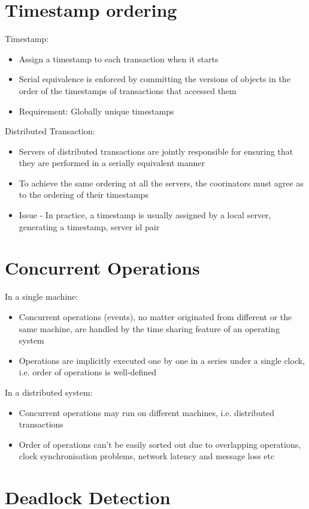 \documentclass{article}[18pt]
\begin{document}
\section{Timestamp ordering}
Timestamp:
\begin{itemize}
	\item Assign a timestamp to each transaction when it starts
	\item Serial equivalence is enforced by committing the versions of objects in the order of the timestamps of transactions that accessed them
	\item Requirement: Globally unique timestamps
\end{itemize}
Distributed Transaction:
\begin{itemize}
	\item Servers of distributed transactions are jointly responsible for ensuring that they are performed in a serially equivalent manner
	\item To achieve the same ordering at all the servers, the coorinators must agree as to the ordering of their timestamps
	\item Issue - In practice, a timestamp is usually assigned by a local server, generating a timestamp, server id pair
\end{itemize}
\section{Concurrent Operations}
In a single machine:
\begin{itemize}
	\item Concurrent operations (events), no matter originated from different or the same machine, are handled by the time sharing feature of an operating system
	\item Operations are implicitly executed one by one in a series under a single clock, i.e. order of operations is well-defined
\end{itemize}
In a distributed system:
\begin{itemize}
	\item Concurrent operations may run on different machines, i.e. distributed transactions
	\item Order of operations can't be easily sorted out due to overlapping operations, clock synchronisation problems, network latency and message loss etc
\end{itemize}
\section{Deadlock Detection}
\end{document}
